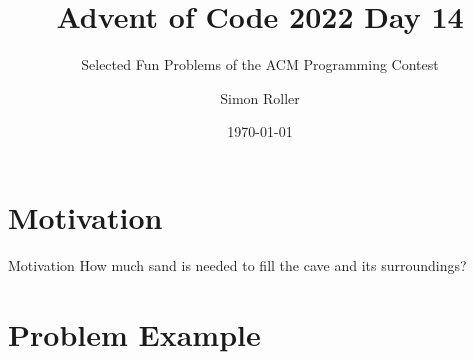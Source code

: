 \documentclass{beamer}
\title[Advent of Code 2022 Day 14]{Advent of Code 2022 Day 14}
\subtitle{Selected Fun Problems of the ACM Programming Contest}
\author{Simon Roller}
\institute{University of Tübingen}
\date{\today} %
\newcommand{\motivationTitle}{How much sand is needed to fill the cave and its surroundings?}
\begin{document}
\begin{frame}
    \titlepage
\end{frame}

\section{Motivation}

\begin{frame}{Motivation}
    \motivationTitle
    \begin{figure}[H]
        \centering
        
    \end{figure}
\end{frame}

\section{Problem Example}
\end{document}
